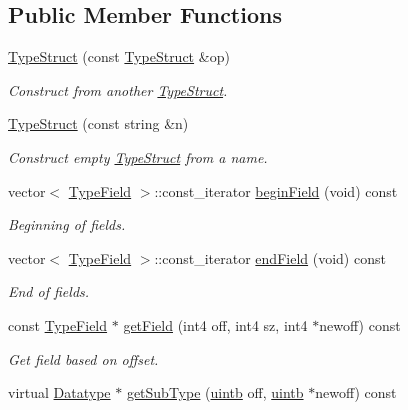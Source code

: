 \subsection*{Public Member Functions}
\begin{DoxyCompactItemize}
\item 
\mbox{\hyperlink{class_type_struct_a59569e7e7c6d5fc43ec7617199cd8a19}{Type\+Struct}} (const \mbox{\hyperlink{class_type_struct}{Type\+Struct}} \&op)
\begin{DoxyCompactList}\small\item\em Construct from another \mbox{\hyperlink{class_type_struct}{Type\+Struct}}. \end{DoxyCompactList}\item 
\mbox{\hyperlink{class_type_struct_a52aa6654acd207898ce84dcf774162ad}{Type\+Struct}} (const string \&n)
\begin{DoxyCompactList}\small\item\em Construct empty \mbox{\hyperlink{class_type_struct}{Type\+Struct}} from a name. \end{DoxyCompactList}\item 
vector$<$ \mbox{\hyperlink{struct_type_field}{Type\+Field}} $>$\+::const\+\_\+iterator \mbox{\hyperlink{class_type_struct_a16f83552f46976a606175eb082fef7ec}{begin\+Field}} (void) const
\begin{DoxyCompactList}\small\item\em Beginning of fields. \end{DoxyCompactList}\item 
vector$<$ \mbox{\hyperlink{struct_type_field}{Type\+Field}} $>$\+::const\+\_\+iterator \mbox{\hyperlink{class_type_struct_a13a3ae8010726876454984d8f1fccfc8}{end\+Field}} (void) const
\begin{DoxyCompactList}\small\item\em End of fields. \end{DoxyCompactList}\item 
const \mbox{\hyperlink{struct_type_field}{Type\+Field}} $\ast$ \mbox{\hyperlink{class_type_struct_aebb450d9b8d2ad526b35ff135d5640a1}{get\+Field}} (int4 off, int4 sz, int4 $\ast$newoff) const
\begin{DoxyCompactList}\small\item\em Get field based on offset. \end{DoxyCompactList}\item 
virtual \mbox{\hyperlink{class_datatype}{Datatype}} $\ast$ \mbox{\hyperlink{class_type_struct_abf638d0fc1902b030f0134c5152a3818}{get\+Sub\+Type}} (\mbox{\hyperlink{types_8h_a2db313c5d32a12b01d26ac9b3bca178f}{uintb}} off, \mbox{\hyperlink{types_8h_a2db313c5d32a12b01d26ac9b3bca178f}{uintb}} $\ast$newoff) const

\end{DoxyCompactItemize}
